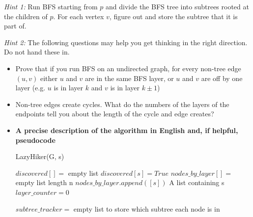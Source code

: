 \documentclass[letterpaper,11pt]{article}
\begin{document}
\begin{enumerate}
\emph{Hint 1:} Run BFS starting from $p$ and divide the BFS tree into subtrees rooted at the  children of $p$. For each vertex $v$, figure out and store the subtree that it is part of. 

\textit{Hint 2:} The following questions may help you get thinking in the right direction. Do not hand these in. 
\begin{itemize}
    \item Prove that if you run BFS on an undirected graph, for every non-tree edge $(u,v)$ either $u$ and $v$ are in the same BFS layer, or $u$ and $v$ are off by one layer (e.g. $u$ is in layer $k$ and $v$ is in layer $k\pm1$)
    \item Non-tree edges create cycles. What do the numbers of the layers of the endpoints tell you about the length of the cycle and edge creates?
\end{itemize}

\begin{itemize}
    \color{teal}
    \item \textbf{A precise description of the algorithm in English and, if 
        helpful, pseudocode}

        \color{black}
        \begin{algorithm}[H]
            \color{teal}
            \caption{LazyHiker(G, s)} 
            $discovered[] =$ empty list \;
            $discovered[s] = True$ \;
            $nodes\_by\_layer[] =$ empty list length n\;
            $nodes\_by\_layer.append([s])$ A list containing s \;
            $layer\_counter = 0$ \;

            $subtree\_tracker =$ empty list to store which subtree each node is in \;



\end{algorithm}
\end{itemize}
\end{enumerate}
\end{document}
